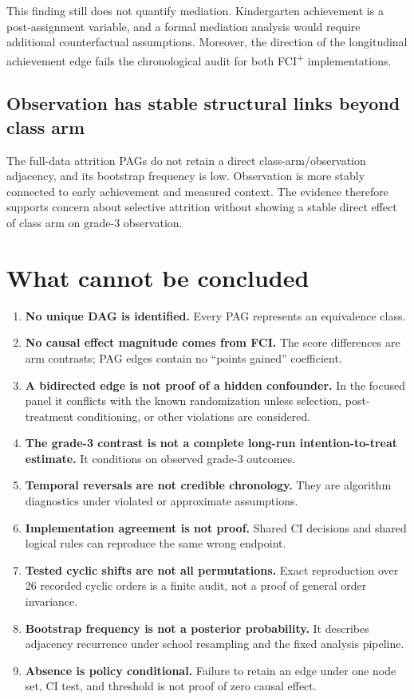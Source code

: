 \documentclass[11pt,a4paper,oneside]{report}
\newcommand{\FCIplus}{FCI\textsuperscript{+}}
\begin{document}
This finding still does not quantify mediation. Kindergarten achievement is a
post-assignment variable, and a formal mediation analysis would require
additional counterfactual assumptions. Moreover, the direction of the
longitudinal achievement edge fails the chronological audit for both
\FCIplus{} implementations.

\subsection{Observation has stable structural links beyond class arm}

The full-data attrition PAGs do not retain a direct class-arm/observation
adjacency, and its bootstrap frequency is low. Observation is more stably
connected to early achievement and measured context. The evidence therefore
supports concern about selective attrition without showing a stable direct
effect of class arm on grade-3 observation.

\section{What cannot be concluded}

\begin{enumerate}[leftmargin=2em]
  \item \textbf{No unique DAG is identified.} Every PAG represents an
        equivalence class.
  \item \textbf{No causal effect magnitude comes from FCI.} The score
        differences are arm contrasts; PAG edges contain no ``points gained''
        coefficient.
  \item \textbf{A bidirected edge is not proof of a hidden confounder.} In the
        focused panel it conflicts with the known randomization unless
        selection, post-treatment conditioning, or other violations are
        considered.
  \item \textbf{The grade-3 contrast is not a complete long-run
        intention-to-treat estimate.} It conditions on observed grade-3
        outcomes.
  \item \textbf{Temporal reversals are not credible chronology.} They are
        algorithm diagnostics under violated or approximate assumptions.
  \item \textbf{Implementation agreement is not proof.} Shared CI decisions
        and shared logical rules can reproduce the same wrong endpoint.
  \item \textbf{Tested cyclic shifts are not all permutations.} Exact
        reproduction over 26 recorded cyclic orders is a finite audit, not a
        proof of general order invariance.
  \item \textbf{Bootstrap frequency is not a posterior probability.} It
        describes adjacency recurrence under school resampling and the fixed
        analysis pipeline.
  \item \textbf{Absence is policy conditional.} Failure to retain an edge
        under one node set, CI test, and threshold is not proof of zero causal
        effect.
\end{enumerate}
\end{document}
